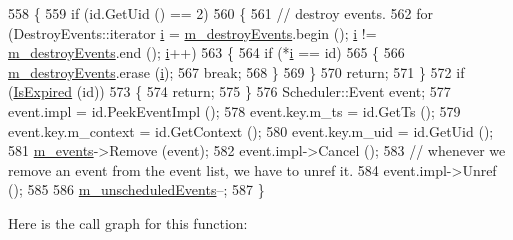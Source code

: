 \begin{DoxyCode}
558 \{
559   \textcolor{keywordflow}{if} (\textcolor{keywordtype}{id}.GetUid () == 2)
560     \{
561       \textcolor{comment}{// destroy events.}
562       \textcolor{keywordflow}{for} (DestroyEvents::iterator \hyperlink{bernuolliDistribution_8m_a6f6ccfcf58b31cb6412107d9d5281426}{i} = \hyperlink{classns3_1_1DistributedSimulatorImpl_a06452ba2e8208fef78ed3ee8a788eb13}{m\_destroyEvents}.begin (); 
      \hyperlink{bernuolliDistribution_8m_a6f6ccfcf58b31cb6412107d9d5281426}{i} != \hyperlink{classns3_1_1DistributedSimulatorImpl_a06452ba2e8208fef78ed3ee8a788eb13}{m\_destroyEvents}.end (); \hyperlink{bernuolliDistribution_8m_a6f6ccfcf58b31cb6412107d9d5281426}{i}++)
563         \{
564           \textcolor{keywordflow}{if} (*\hyperlink{bernuolliDistribution_8m_a6f6ccfcf58b31cb6412107d9d5281426}{i} == \textcolor{keywordtype}{id})
565             \{
566               \hyperlink{classns3_1_1DistributedSimulatorImpl_a06452ba2e8208fef78ed3ee8a788eb13}{m\_destroyEvents}.erase (\hyperlink{bernuolliDistribution_8m_a6f6ccfcf58b31cb6412107d9d5281426}{i});
567               \textcolor{keywordflow}{break};
568             \}
569         \}
570       \textcolor{keywordflow}{return};
571     \}
572   \textcolor{keywordflow}{if} (\hyperlink{classns3_1_1DistributedSimulatorImpl_a2f1a2977c37fa67851180aefe3e40830}{IsExpired} (\textcolor{keywordtype}{id}))
573     \{
574       \textcolor{keywordflow}{return};
575     \}
576   Scheduler::Event event;
577   \textcolor{keyword}{event}.impl = \textcolor{keywordtype}{id}.PeekEventImpl ();
578   \textcolor{keyword}{event}.key.m\_ts = \textcolor{keywordtype}{id}.GetTs ();
579   \textcolor{keyword}{event}.key.m\_context = \textcolor{keywordtype}{id}.GetContext ();
580   \textcolor{keyword}{event}.key.m\_uid = \textcolor{keywordtype}{id}.GetUid ();
581   \hyperlink{classns3_1_1DistributedSimulatorImpl_a62caa947f3f3c6c79b6d58b6949d2c10}{m\_events}->Remove (event);
582   \textcolor{keyword}{event}.impl->Cancel ();
583   \textcolor{comment}{// whenever we remove an event from the event list, we have to unref it.}
584   \textcolor{keyword}{event}.impl->Unref ();
585 
586   \hyperlink{classns3_1_1DistributedSimulatorImpl_ab02d06ce1c42a073c45b5ab0ed8d45d6}{m\_unscheduledEvents}--;
587 \}
\end{DoxyCode}


Here is the call graph for this function\+:


